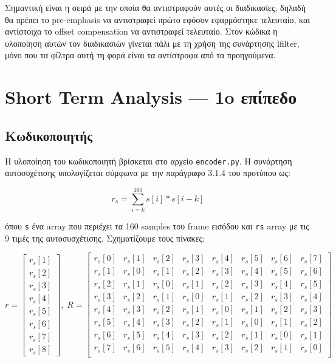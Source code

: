 \documentclass{article}
\begin{document}
Σημαντική είναι η σειρά με την οποία θα αντιστραφούν αυτές οι διαδικασίες,
δηλαδή θα πρέπει το pre-emphasis να αντιστραφεί πρώτο εφόσον εφαρμόστηκε 
τελευταίο, και αντίστοιχα το offset compensation να αντιστραφεί τελευταίο.
Στον κώδικα η υλοποίηση αυτών τον διαδικασιών γίνεται πάλι με τη χρήση της 
συνάρτησης lfilter, μόνο που τα φίλτρα αυτή τη φορά είναι τα αντίστροφα 
από τα προηγούμενα.


\section{Short Term Analysis --- 1o επίπεδο} 
\subsection{Κωδικοποιητής}
Η υλοποίηση του κωδικοποιητή βρίσκεται στο αρχείο \verb|encoder.py|.
Η συνάρτηση αυτοσυχέτισης 
υπολογίζεται σύμφωνα με την παράγραφο 3.1.4 του προτύπου ως:

\begin{equation}
    r_s = \sum_{i=k}^{160} s[i]*s[i-k]
\end{equation}

όπου \verb|s| ένα array που περιέχει τα 160 samples του frame εισόδου
και \verb|rs| array με τις 9 τιμές της αυτοσυσχέτισης.
Σχηματίζουμε τους πίνακες:

\begin{equation}
    r = \left[\begin{matrix}
        r_s[1] \\
        r_s[2] \\
        r_s[3] \\
        r_s[4] \\
        r_s[5] \\
        r_s[6] \\
        r_s[7] \\
        r_s[8]
    \end{matrix}\right],\;
    R = \left[\begin{matrix}
        r_s[0] & r_s[1] & r_s[2] & r_s[3] & r_s[4] & r_s[5] & r_s[6] & r_s[7] \\
        r_s[1] & r_s[0] & r_s[1] & r_s[2] & r_s[3] & r_s[4] & r_s[5] & r_s[6] \\
        r_s[2] & r_s[1] & r_s[0] & r_s[1] & r_s[2] & r_s[3] & r_s[4] & r_s[5] \\
        r_s[3] & r_s[2] & r_s[1] & r_s[0] & r_s[1] & r_s[2] & r_s[3] & r_s[4] \\
        r_s[4] & r_s[3] & r_s[2] & r_s[1] & r_s[0] & r_s[1] & r_s[2] & r_s[3] \\ 
        r_s[5] & r_s[4] & r_s[3] & r_s[2] & r_s[1] & r_s[0] & r_s[1] & r_s[2] \\ 
        r_s[6] & r_s[5] & r_s[4] & r_s[3] & r_s[2] & r_s[1] & r_s[0] & r_s[1] \\
        r_s[7] & r_s[6] & r_s[5] & r_s[4] & r_s[3] & r_s[2] & r_s[1] & r_s[0] \\
    \end{matrix}\right]
\end{equation}
\end{document}
